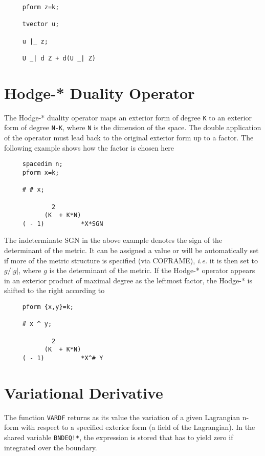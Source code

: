 \documentclass[11pt,letterpaper]{book}
\makeatletter
\newcommand{\underscore}{\_}
\newcommand{\ttindex}[1]{{\renewcommand{\_}{\protect\underscore}%
                          \index{#1@{\tt #1}}}}
\makeatother
\begin{document}
{\small\begin{verbatim}
     pform z=k;

     tvector u;

     u |_ z;

     U _| d Z + d(U _| Z)
\end{verbatim}}

\section{Hodge-* Duality Operator}

The Hodge-*\label{hodge} duality operator maps an exterior form of degree
{\tt K} to an exterior form of degree {\tt N-K}, where {\tt N} is the
dimension of the space.  The double application of the operator must
lead back to the original exterior form up to a factor. The following
example shows how the factor is chosen here

{\small\begin{verbatim}
     spacedim n;
     pform x=k;

     # # x;

             2
           (K  + K*N)
     ( - 1)          *X*SGN
\end{verbatim}}

The indeterminate SGN in the above example denotes the sign of the
determinant of the metric. It can be assigned a value or will be
automatically set if more of the metric structure is specified (via
COFRAME), {\em i.e.} it is then set to $g/|g|$, where $g$ is the
determinant of the metric.  If the Hodge-* operator appears in an
exterior product of maximal degree as the leftmost factor, the Hodge-*
is shifted to the right according to

{\small\begin{verbatim}
     pform {x,y}=k;

     # x ^ y;

             2
           (K  + K*N)
     ( - 1)          *X^# Y
\end{verbatim}}

\section{Variational Derivative}

\ttindex{VARDF}
The function {\tt VARDF}\label{VARDF} returns as its value the
variation of a given Lagrangian n-form with respect to a specified
exterior form (a field of the Lagrangian).  In the shared variable
\ttindex{BNDEQ"!*}
{\tt BNDEQ!*}, the expression is stored that has to yield zero if
integrated over the boundary.
\end{document}
